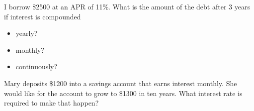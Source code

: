 
\begin{ProblemSet}
 \begin{Problem}[pencil space=2.5in]
  I borrow \$2500 at an APR of 11\%.
  What is the amount of the debt after 3 years if interest is compounded
  \begin{itemize}
  \item yearly?
  \item monthly?
  \item continuously?
  \end{itemize}
 \end{Problem}
 \begin{Problem}[pencil space=3in]
  Mary deposits \$1200 into a savings account that earns interest monthly.
  She would like for the account to grow to \$1300 in ten years.
  What interest rate is required to make that happen?
 \end{Problem}
\end{ProblemSet}

